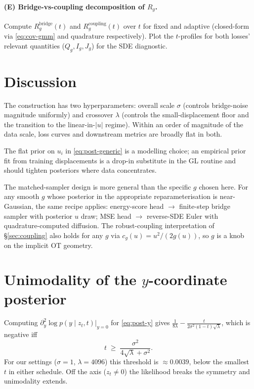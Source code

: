 \documentclass[11pt]{article}
\begin{document}
\paragraph{(E) Bridge-vs-coupling decomposition of $R_g$.} Compute
$R_g^{\text{bridge}}(t)$ and $R_g^{\text{coupling}}(t)$ over $t$ for
fixed and adaptive (closed-form via \eqref{eq:cov-gmm} and quadrature
respectively). Plot the $t$-profiles for both losses' relevant
quantities ($Q_g, I_g, J_g$) for the SDE diagnostic.

\section{Discussion}

The construction has two hyperparameters: overall scale $\sigma$
(controls bridge-noise magnitude uniformly) and crossover $\lambda$
(controls the small-displacement floor and the transition to the
linear-in-$|u|$ regime). Within an order of magnitude of the data scale,
loss curves and downstream metrics are broadly flat in both.

The flat prior on $u_i$ in \eqref{eq:post-generic} is a modelling
choice; an empirical prior fit from training displacements is a drop-in
substitute in the GL routine and should tighten posteriors where data
concentrates.

The matched-sampler design is more general than the specific $g$ chosen
here. For any smooth $g$ whose posterior in the appropriate
reparameterisation is near-Gaussian, the same recipe applies:
energy-score head $\to$ finite-step bridge sampler with posterior $u$
draw; MSE head $\to$ reverse-SDE Euler with quadrature-computed
diffusion. The robust-coupling interpretation of \S\ref{sec:coupling}
also holds for any $g$ via $c_g(u)=u^2/(2g(u))$, so $g$ is a knob on the
implicit OT geometry.

\appendix
\section{Unimodality of the $y$-coordinate posterior}
\label{app:unimodal}

Computing $\partial_y^2\log p(y\mid z_t,t)|_{y=0}$ for \eqref{eq:post-y}
gives
$\tfrac{1}{8\lambda} - \tfrac{t}{2\sigma^2(1-t)\sqrt\lambda}$, which is
negative iff
\[
    t\;\geq\;\frac{\sigma^2}{4\sqrt\lambda + \sigma^2}.
\]
For our settings ($\sigma=1$, $\lambda=4096$) this threshold is
$\approx 0.0039$, below the smallest $t$ in either schedule. Off the
axis ($z_t\ne 0$) the likelihood breaks the symmetry and unimodality
extends.
\end{document}

